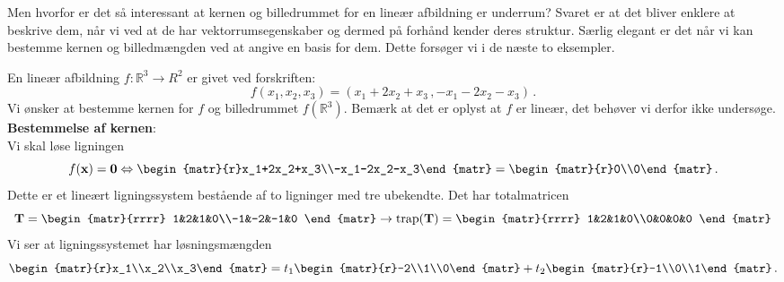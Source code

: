 Men hvorfor er det så interessant at kernen og billedrummet for en lineær afbildning er underrum? Svaret er at det bliver enklere at beskrive dem, når vi ved at de har vektorrumsegenskaber og dermed på forhånd kender deres struktur. Særlig elegant er det når vi kan bestemme kernen og billedmængden ved at angive en basis for dem. Dette forsøger vi i de næste to eksempler. 

\begin{example} \label{tn8.exKerne}
En lineær afbildning $f:\mathbb R^3 \rightarrow R^2$ er givet ved forskriften:
\begin{equation}
f(x_1,x_2,x_3)=(x_1+2x_2+x_3\,,-x_1-2x_2-x_3)\,.
\end{equation}
Vi ønsker at bestemme kernen for $f$ og billedrummet $f(\mathbb R^3)$. Bemærk at det er oplyst at $f$ er lineær, det behøver vi derfor ikke undersøge.\bs
\textbf{Bestemmelse af kernen}: \\
Vi skal løse ligningen
\begin{equation}\label{tn8.exKernea}
f(\mathbf x)=\mnul\Leftrightarrow
\begin{matr}{r}x_1+2x_2+x_3\\-x_1-2x_2-x_3\end{matr}
=\begin{matr}{r}0\\0\end{matr}\,.
\end{equation}
Dette er et lineært ligningssystem bestående af to ligninger med tre ubekendte. Det har totalmatricen
$$
\mT=
\begin{matr}{rrrr}
1&2&1&0\\-1&-2&-1&0 \end{matr}
\rightarrow \mathrm{trap}(\mT)=
\begin{matr}{rrrr}
1&2&1&0\\0&0&0&0 \end{matr}
$$
Vi ser at ligningssystemet har løsningsmængden
$$
\begin{matr}{r}x_1\\x_2\\x_3\end{matr}
=t_1\begin{matr}{r}-2\\1\\0\end{matr}
+t_2\begin{matr}{r}-1\\0\\1\end{matr}\,.$$

\end{example}
